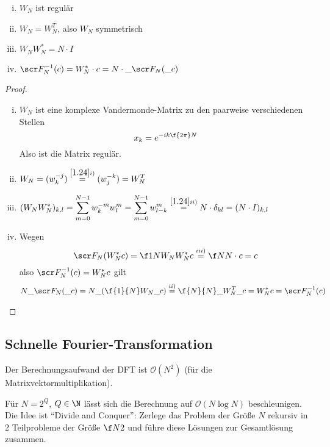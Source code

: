 \documentclass[11pt]{scrbook}
\begin{document}
\begin{lem}[Eigenschaften] \label{1.27}
	\begin{enumerate}[i)]
		\item
			$\displaystyle W_N$ ist regulär
		\item
			$\displaystyle W_N = W_N^T$, also $W_N$ symmetrisch
		\item
			$\displaystyle W_NW_N^{*} = N\cdot I$
		\item
			$\displaystyle \scr F_N^{-1}(c) = W^*_N\cdot c = N \cdot \_{\scr F_N(\_c)}$
	\end{enumerate}
	\begin{proof}
		\begin{enumerate}[i)]
			\item
				$W_N$ ist eine komplexe Vandermonde-Matrix zu den paarweise verschiedenen Stellen
				\[
					x_k = e^{-ik\f {2\pi}N}
				\]
				Also ist die Matrix regulär.
			\item
				$\displaystyle W_N = (w_k^{-j}) \stackrel{\ref{1.24} i)}=  (w_j^{-k}) = W_N^T$
			\item
				$\displaystyle (W_NW_N^*)_{k,l} = \sum_{m=0}^{N-1} w_k^{-m}w_l^m = \sum_{m=0}^{N-1} w_{l-k}^m \stackrel{\ref{1.24} ii)}= N\cdot \delta_{kl} = (N\cdot I)_{k,l}$
			\item
				Wegen
				\[
					\scr F_N (W_N^* c) = \f 1N W_N W_N^* c \stackrel{iii)}= \f N N \cdot c = c
				\]
				also $\scr F_N^{-1} (c) = W_N^* c$ gilt
				\[
					N \_{\scr F_N(\_c)}
					= N \_{\left(\f {1}{N} W_N \_c\right)} 
					\stackrel{ii)}= \f{N}{N} \_{W_N^T \_c} 
					= W_N^* c 
					= \scr F_N^{-1}(c)
				\]
		\end{enumerate}
	\end{proof}
\end{lem}


\subsection{Schnelle Fourier-Transformation}

Der Berechnungsaufwand der DFT ist $\mathcal O(N^2)$ (für die Matrixvektormultiplikation).

Für $N=2^Q$, $Q\in \N$ lässt sich die Berechnung auf $\mathcal O(N\log N)$ beschleunigen.
Die Idee ist “Divide and Conquer”: Zerlege das Problem der Größe $N$ rekursiv in 2 Teilprobleme der Größe $\f N2$ und führe diese Lösungen zur Gesamtlösung zusammen.
\end{document}
